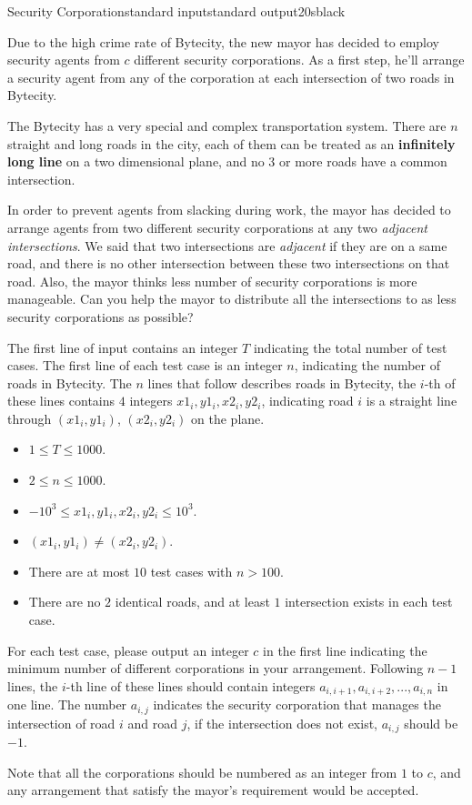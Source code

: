 \begin{problem}{Security Corporation}{standard input}{standard output}{20s}{black}

Due to the high crime rate of Bytecity, the new mayor has decided to employ security agents from $c$ different security corporations.
As a first step, he'll arrange a security agent from any of the corporation at each intersection of two roads in Bytecity.

The Bytecity has a very special and complex transportation system.
There are $n$ straight and long roads in the city, each of them can be treated as an {\bf infinitely long line} on a two dimensional plane, and no $3$ or more roads have a common intersection.

In order to prevent agents from slacking during work, the mayor has decided to arrange agents from two different security corporations at any two {\it adjacent intersections}.
We said that two intersections are {\it adjacent} if they are on a same road, and there is no other intersection between these two intersections on that road.
Also, the mayor thinks less number of security corporations is more manageable. Can you help the mayor to distribute all the intersections to as less security corporations as possible?

\InputFile
The first line of input contains an integer $T$ indicating the total number of test cases.
The first line of each test case is an integer $n$, indicating the number of roads in Bytecity. The $n$ lines that follow describes roads in Bytecity, the $i$-th of these lines contains $4$ integers $x1_i, y1_i, x2_i, y2_i$, indicating road $i$ is a straight line through $(x1_i, y1_i)$, $(x2_i, y2_i)$ on the plane.
\begin{itemize}
\item $1 \le T \le 1000$.
\item $2 \le n \le 1000$.
\item $-10^3 \le x1_i, y1_i, x2_i, y2_i \le 10^3$.
\item $(x1_i,y1_i) \neq (x2_i, y2_i)$.
\item There are at most $10$ test cases with $n > 100$.
\item There are no $2$ identical roads, and at least $1$ intersection exists in each test case.
\end{itemize}

\OutputFile
For each test case, please output an integer $c$ in the first line indicating the minimum number of different corporations in your arrangement. Following $n-1$ lines, the $i$-th line of these lines should contain integers $a_{i,i+1}, a_{i,i+2}, ..., a_{i,n}$ in one line. The number $a_{i,j}$ indicates the security corporation that manages the intersection of road $i$ and road $j$, if the intersection does not exist, $a_{i,j}$ should be $-1$.

Note that all the corporations should be numbered as an integer from $1$ to $c$, and any arrangement that satisfy the mayor's requirement would be accepted.

\Example

\begin{example}
%
\end{example}
\end{problem}